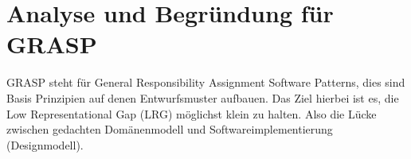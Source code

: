 \section{Analyse und Begründung für GRASP} %
GRASP steht für General Responsibility Assignment Software Patterns, dies sind Basis Prinzipien auf denen Entwurfsmuster aufbauen.
Das Ziel hierbei ist es, die Low Representational Gap (LRG) möglichst klein zu halten.
Also die Lücke zwischen gedachten Domänenmodell und Softwareimplementierung (Designmodell).
